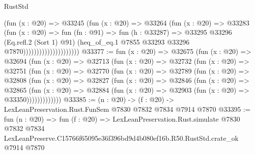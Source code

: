 \begin{lexlean}{RustStd}
\begin{coremodule}
                                    (fun (x : @20) =>
                                    @33245
                                      (fun (x : @20) =>
                                      @33264
                                        (fun (x : @20) =>
                                        @33283
                                          (fun (x : @20) =>
                                          fun (fn : @91) =>
                                          fun (h : @33287) =>
                                          @33295
                                            @33296
                                            (Eq.refl.{2} (Sort 1) @91)
                                            (heq_of_eq.{1}
                                              @7855
                                              @33293
                                              @33296
                                              @7870)))))))))))))))))))))
@33377 := fun (x : @20) =>
  @32675
    (fun (x : @20) =>
    @32694
      (fun (x : @20) =>
      @32713
        (fun (x : @20) =>
        @32732
          (fun (x : @20) =>
          @32751
            (fun (x : @20) =>
            @32770
              (fun (x : @20) =>
              @32789
                (fun (x : @20) =>
                @32808
                  (fun (x : @20) =>
                  @32827
                    (fun (x : @20) =>
                    @32846
                      (fun (x : @20) =>
                      @32865
                        (fun (x : @20) =>
                        @32884 (fun (x : @20) => @32903 (fun (x : @20) => @33350)))))))))))))
@33385 := (n : @20) -> (f : @20) -> LexLeanPreservation.Rust.FunSem @7830 @7832 @7834 @7914 @7870
@33395 := fun (n : @20) =>
  fun (f : @20) =>
  LexLeanPreservation.Rust.simulate
    @7830
    @7832
    @7834
    LexLeanPreserve.C15766f65095e36f396bd9d4b080ef16b.R50.RustStd.crate_ok
    @7914
    @7870
\end{coremodule}
\end{lexlean}
